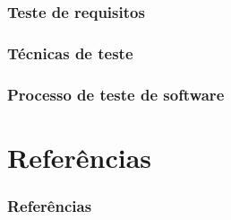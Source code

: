\documentclass[utf8, usepdftitle=false, svgnames, color={table,
fixpdftex, hyperref, fixinclude, xcdraw}, t, brazil]{beamer}
\begin{document}
 \section{Teste de requisitos}
 

 \section{Técnicas de teste}
  
 
 \section{Processo de teste de software}
  
 
 \part{Referências}
 
 \section{Referências}
 
\end{document}
